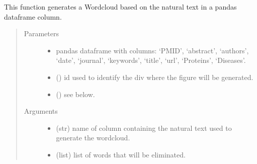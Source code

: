 \documentclass[letterpaper,10pt,english]{sphinxmanual}
\begin{document}

\begin{fulllineitems}
\label{\detokenize{_autosummary/analytics_core.viz:analytics_core.viz.viz.get_wordcloud}}
This function generates a Wordcloud based on the natural text in a pandas dataframe column.
\begin{quote}\begin{description}
\item[{Parameters}] \leavevmode\begin{itemize}
\item {} 
 \textendash{} pandas dataframe with columns: ‘PMID’, ‘abstract’, ‘authors’, ‘date’, ‘journal’, ‘keywords’, ‘title’, ‘url’, ‘Proteins’, ‘Diseases’.

\item {} 
 () \textendash{} id used to identify the div where the figure will be generated.

\item {} 
 () \textendash{} see below.

\end{itemize}

\item[{Arguments}] \leavevmode\begin{itemize}
\item {} 
 (str) \textendash{} name of column containing the natural text used to generate the wordcloud.

\item {} 
 (list) \textendash{} list of words that will be eliminated.


\end{itemize}
\end{description}
\end{quote}
\end{fulllineitems}
\end{document}
